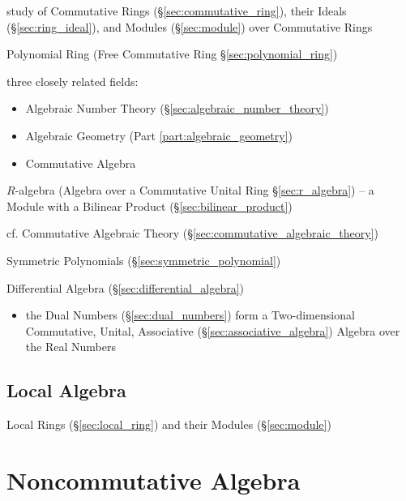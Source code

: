 study of Commutative Rings (\S\ref{sec:commutative_ring}), their Ideals
(\S\ref{sec:ring_ideal}), and Modules (\S\ref{sec:module}) over Commutative
Rings

Polynomial Ring (Free Commutative Ring \S\ref{sec:polynomial_ring})

three closely related fields:
\begin{itemize}
  \item Algebraic Number Theory (\S\ref{sec:algebraic_number_theory})
  \item Algebraic Geometry (Part \ref{part:algebraic_geometry})
  \item Commutative Algebra
\end{itemize}

\fist $R$-algebra (Algebra over a Commutative Unital Ring \S\ref{sec:r_algebra})
-- a Module with a Bilinear Product (\S\ref{sec:bilinear_product})

\fist cf. Commutative Algebraic Theory
(\S\ref{sec:commutative_algebraic_theory})

\fist Symmetric Polynomials (\S\ref{sec:symmetric_polynomial})

\fist Differential Algebra (\S\ref{sec:differential_algebra})

\begin{itemize}
  \item the Dual Numbers (\S\ref{sec:dual_numbers}) form a Two-dimensional
    Commutative, Unital, Associative (\S\ref{sec:associative_algebra}) Algebra
    over the Real Numbers
\end{itemize}



\subsection{Local Algebra}\label{sec:local_algebra}

Local Rings (\S\ref{sec:local_ring}) and their Modules (\S\ref{sec:module})



\section{Noncommutative Algebra}\label{sec:noncommutative_algebra}

